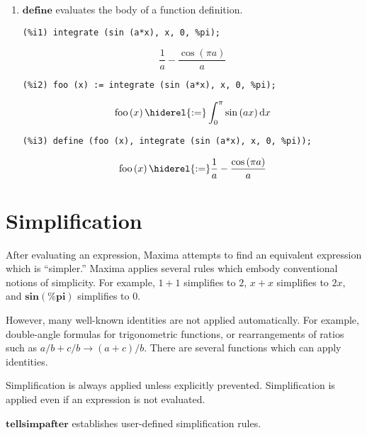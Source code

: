 \documentclass[12pt,leqno]{article}
\begin{document}
\begin{enumerate}
\item $\mathbf{define}$ evaluates the body of a function definition.
\begin{verbatim}
(%i1) integrate (sin (a*x), x, 0, %pi);
\end{verbatim}
\begin{dmath}[number={\(\mathop{\mathrm{\%o}_{1}}\)}]
\frac{1}{a}-\frac{\cos \left(\pi a\right)}{a}
\end{dmath}
\begin{verbatim}
(%i2) foo (x) := integrate (sin (a*x), x, 0, %pi);
\end{verbatim}
\begin{dmath}[number={\(\mathop{\mathrm{\%o}_{2}}\)}]
\mathop{\mathrm{foo}}\left(x\right) \hiderel{:=} \int_{0}^{\pi} \sin \left(a x\right)\mathop{\mathrm{d}x}
\end{dmath}
\begin{verbatim}
(%i3) define (foo (x), integrate (sin (a*x), x, 0, %pi));
\end{verbatim}
\begin{dmath}[number={\(\mathop{\mathrm{\%o}_{3}}\)}]
\mathop{\mathrm{foo}}\left(x\right) \hiderel{:=} \frac{1}{a}-\frac{\cos \left(\pi a\right)}{a}
\end{dmath}


\end{enumerate}

\section{Simplification}

After evaluating an expression,
Maxima attempts to find an equivalent expression which is ``simpler.''
Maxima applies several rules which embody conventional notions of simplicity.
For example,
$1 + 1$ simplifies to $2$,
$x + x$ simplifies to $2 x$,
and $\mathbf{sin}(\mathbf{\%pi})$ simplifies to $0$.

However,
many well-known identities are not applied automatically.
For example,
double-angle formulas for trigonometric functions,
or rearrangements of ratios such as $a/b + c/b \rightarrow (a + c)/b$.
There are several functions which can apply identities.

Simplification is always applied unless explicitly prevented.
Simplification is applied even if an expression is not evaluated.

$\mathbf{tellsimpafter}$ establishes user-defined simplification rules.
\end{document}
